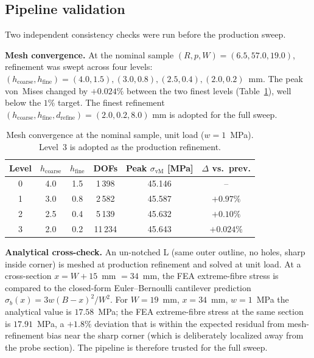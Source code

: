\documentclass[11pt]{article}
\begin{document}
\subsection{Pipeline validation}

Two independent consistency checks were run before the production sweep.

\textbf{Mesh convergence.} At the nominal sample
$(R, p, W) = (6.5, 57.0, 19.0)$, refinement was swept across four levels:
$(h_{\text{coarse}}, h_{\text{fine}}) =
(4.0, 1.5), (3.0, 0.8), (2.5, 0.4), (2.0, 0.2)$~mm. The peak von~Mises
changed by $+0.024\%$ between the two finest levels (Table~\ref{tab:conv}),
well below the $1\%$ target. The finest refinement
$(h_{\text{coarse}}, h_{\text{fine}}, d_{\text{refine}}) = (2.0, 0.2, 8.0)$
mm is adopted for the full sweep.

\begin{table}[t]
  \centering
  \begin{tabular}{cccccc}
    \toprule
    Level & $h_{\text{coarse}}$ & $h_{\text{fine}}$ & DOFs &
    Peak $\sigma_{\mathrm{vM}}$ [MPa] & $\Delta$ vs.\ prev. \\
    \midrule
    0 & 4.0 & 1.5 & 1\,398   & 45.146 & --         \\
    1 & 3.0 & 0.8 & 2\,582   & 45.587 & $+0.97\%$  \\
    2 & 2.5 & 0.4 & 5\,139   & 45.632 & $+0.10\%$  \\
    3 & 2.0 & 0.2 & 11\,234  & 45.643 & $+0.024\%$ \\
    \bottomrule
  \end{tabular}
  \caption{Mesh convergence at the nominal sample, unit load
    ($w = 1$~MPa). Level~3 is adopted as the production refinement.}
  \label{tab:conv}
\end{table}

\textbf{Analytical cross-check.} An un-notched L (same outer outline, no
holes, sharp inside corner) is meshed at production refinement and solved
at unit load. At a cross-section $x = W + 15$~mm $= 34$~mm, the FEA
extreme-fibre stress is compared to the closed-form Euler--Bernoulli
cantilever prediction
$\sigma_b(x) = 3 w (B - x)^2 / W^2$. For $W = 19$~mm, $x = 34$~mm,
$w = 1$~MPa the analytical value is $17.58$~MPa; the FEA extreme-fibre
stress at the same section is $17.91$~MPa, a $+1.8\%$ deviation that is
within the expected residual from mesh-refinement bias near the sharp
corner (which is deliberately localized away from the probe section). The
pipeline is therefore trusted for the full sweep.
\end{document}
